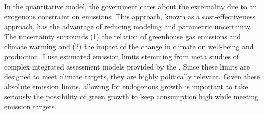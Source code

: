 


In the quantitative model, the government cares about the externality due to an exogenous constraint on emissions. This approach, known as a cost-effectiveness approach, has the advantage of reducing modeling and parametric uncertainty. The uncertainty surrounds (1) the relation of greenhouse gas emissions and climate warming and (2) the impact of the change in climate on well-being and production. I  use estimated emission limits stemming from meta studies of complex integrated assessment models provided by the \cite{IPCC2022}. Since these limits are designed to meet climate targets, they are highly politically relevant.  
Given these absolute emission limits, allowing for endogenous growth is important to take seriously the possibility of green growth to keep consumption high while meeting emission targets. %


